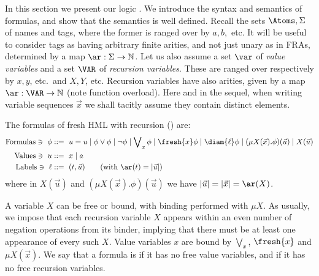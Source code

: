 In this section we present our logic \fhml.
We introduce the syntax and semantics of formulas, and show that the semantics is well defined. 
Recall the sets $\Atoms,\Sigma$ of {names} and tags, where the former is ranged over by $a, b,$ etc.
It will be useful to consider tags as having arbitrary finite {arities}, and not just unary as in FRAs, determined by a map $\ar:\Sigma\to\mathbb{N}$.
Let us also assume a set $\var$ of \emph{value variables} and a set $\VAR$ of \emph{recursion variables}. These are ranged over respectively by
$x,y$, etc.\ and
$X,Y$, etc.
Recursion variables have also {arities}, given by a map $\ar:\VAR\to\mathbb{N}$ (note function overload). Here and in the sequel, when writing variable sequences $\vec x$ we shall tacitly assume they contain distinct elements.

\begin{definition}\label{def:mhmlr}
The formulas of  fresh HML with recursion (\fhml) are:
\begin{align*} 
  \text{Formulas} \ni\ \phi &::=\ u=u\mid \phi\lor\phi\mid \lnot\phi\mid \bigvee\nolimits_{x}\phi
  \mid \fresh{x}\phi\mid \diam{\ell}\phi\mid (\mu X(\vec x).\phi)(\vec u)\mid X(\vec u)\\
  \text{Values} \ni\ u &::=\ x \mid a\\
  \text{Labels} \ni\ \ell &::=\ (t,\vec u)\qquad (\text{with }\ar(t)=|\vec u|)
\end{align*}
where
in $X(\vec u)$ and $(\mu X(\vec x).\phi)(\vec u)$ we have $|\vec u|=|\vec x|=\ar(X)$.
\end{definition}


A variable $X$ can be free or bound, with binding performed with $\mu X$.
 As usually, we impose that each recursion variable $X$ appears within an even number of negation operations from its binder, implying that there must be at least one appearance of every such $X$.  
Value variables $x$ are bound by $\bigvee_{x}$, $\fresh{x}$ and $\mu X(\vec x)$. 
We say that a formula is  if it has no free value variables, and  if it has no free recursion variables.

